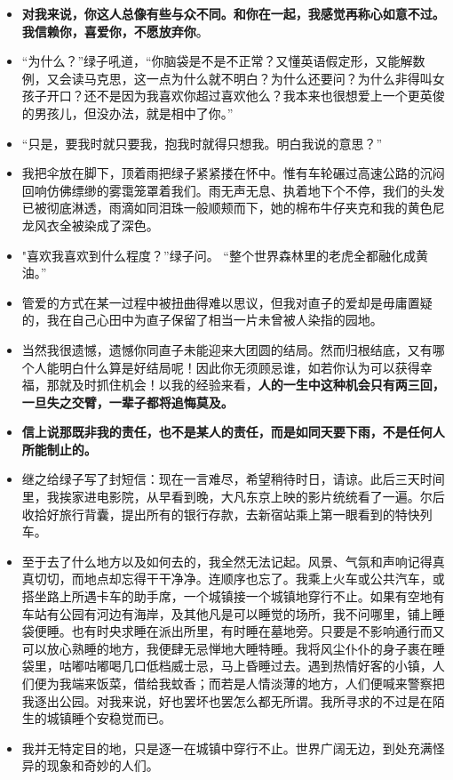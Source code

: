 \documentclass[UTF8,a4paper,8pt]{ctexbook}
\begin{document}
\begin{itemize}
		\item \textbf{对我来说，你这人总像有些与众不同。和你在一起，我感觉再称心如意不过。我信赖你，喜爱你，不愿放弃你}。
		\item “为什么？”绿子吼道，“你脑袋是不是不正常？又懂英语假定形，又能解数例，又会读马克思，这一点为什么就不明白？为什么还要问？为什么非得叫女孩子开口？还不是因为我喜欢你超过喜欢他么？我本来也很想爱上一个更英俊的男孩儿，但没办法，就是相中了你。”
		\item “只是，要我时就只要我，抱我时就得只想我。明白我说的意思？”
		\item 我把伞放在脚下，顶着雨把绿子紧紧搂在怀中。惟有车轮碾过高速公路的沉闷回响仿佛缥缈的雾霭笼罩着我们。雨无声无息、执着地下个不停，我们的头发已被彻底淋透，雨滴如同泪珠一般顺颊而下，她的棉布牛仔夹克和我的黄色尼龙风衣全被染成了深色。
		\item "喜欢我喜欢到什么程度？”绿子问。 “整个世界森林里的老虎全都融化成黄油。”
		\item 管爱的方式在某一过程中被扭曲得难以思议，但我对直子的爱却是毋庸置疑的，我在自己心田中为直子保留了相当一片未曾被人染指的园地。
		\item 当然我很遗憾，遗憾你同直子未能迎来大团圆的结局。然而归根结底，又有哪个人能明白什么算是好结局呢！因此你无须顾忌谁，如若你认为可以获得幸福，那就及时抓住机会！以我的经验来看，\textbf{人的一生中这种机会只有两三回，一旦失之交臂，一辈子都将追悔莫及。}
		\item \textbf{信上说那既非我的责任，也不是某人的责任，而是如同天要下雨，不是任何人所能制止的。}
		\item  继之给绿子写了封短信：现在一言难尽，希望稍待时日，请谅。此后三天时间里，我挨家进电影院，从早看到晚，大凡东京上映的影片统统看了一遍。尔后收拾好旅行背囊，提出所有的银行存款，去新宿站乘上第一眼看到的特快列车。
		\item 至于去了什么地方以及如何去的，我全然无法记起。风景、气氛和声响记得真真切切，而地点却忘得干干净净。连顺序也忘了。我乘上火车或公共汽车，或搭坐路上所遇卡车的助手席，一个城镇接一个城镇地穿行不止。如果有空地有车站有公园有河边有海岸，及其他凡是可以睡觉的场所，我不问哪里，铺上睡袋便睡。也有时央求睡在派出所里，有时睡在墓地旁。只要是不影响通行而又可以放心熟睡的地方，我便肆无忌惮地大睡特睡。我将风尘仆仆的身子裹在睡袋里，咕嘟咕嘟喝几口低档威士忌，马上昏睡过去。遇到热情好客的小镇，人们便为我端来饭菜，借给我蚊香；而若是人情淡薄的地方，人们便喊来警察把我逐出公园。对我来说，好也罢坏也罢怎么都无所谓。我所寻求的不过是在陌生的城镇睡个安稳觉而已。
		\item 我并无特定目的地，只是逐一在城镇中穿行不止。世界广阔无边，到处充满怪异的现象和奇妙的人们。

\end{itemize}
\end{document}
